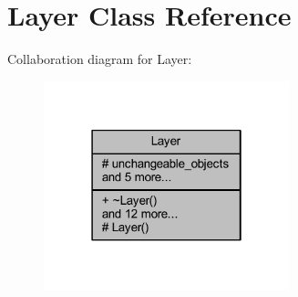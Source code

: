 \hypertarget{class_layer}{}\section{Layer Class Reference}
\label{class_layer}


Collaboration diagram for Layer\+:\nopagebreak
\begin{figure}[H]
\begin{center}
\leavevmode
\includegraphics[width=202pt]{class_layer__coll__graph}
\end{center}
\end{figure}
